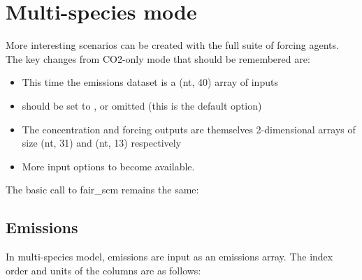 \documentclass[letterpaper,10pt,english]{sphinxmanual}
\begin{document}
\noindent{}


\section{Multi-species mode}
\label{\detokenize{examples:multi-species-mode}}
More interesting scenarios can be created with the full suite of forcing
agents. The key changes from CO2-only mode that should be remembered
are:
\begin{itemize}
\item {} 
This time the emissions dataset is a (nt, 40) array of inputs

\item {} 
 should be set to , or omitted (this is the
default option)

\item {} 
The concentration and forcing outputs are themselves 2-dimensional
arrays of size (nt, 31) and (nt, 13) respectively

\item {} 
More input options to  become available.

\end{itemize}

The basic call to fair\_scm remains the same:

\begin{sphinxVerbatim}[commandchars=\\\{\}]
   
\end{sphinxVerbatim}


\subsection{Emissions}
\label{\detokenize{examples:emissions}}
In multi-species model, emissions are input as an  emissions
array. The index order and units of the columns are as follows:
\end{document}
